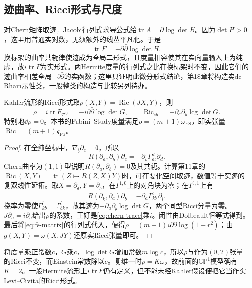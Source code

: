 \subsection{迹曲率、Ricci形式与尺度}
对Chern矩阵取迹，Jacobi行列式求导公式给$\operatorname{tr}A=\partial\log\det H$。因为$\det H>0$，这里用普通实对数，无须额外的线丛平凡化。于是
\begin{equation}\label{eq:chern-trace}
 \operatorname{tr}F=-\partial\bar\partial\log\det H.
\end{equation}
换标架的曲率共轭律使迹成为全局二形式，且度量相容使其在实向量输入上为纯虚，故$i\operatorname{tr}F$为实形式。两Hermite度量的行列式之比在换标架时不变，因此它们的迹曲率相差全局$-\partial\bar\partial$的实函数；这里只证明此微分形式结论，第18章将构造实de Rham示性类，一般整类的构造与比较另列待办。

\begin{theorem}\label{thm:kahler-ricci}
Kahler流形的Ricci形式取$\rho(X,Y)=\operatorname{Ric}(JX,Y)$，则
\begin{equation}\label{eq:kahler-ricci}
 \rho=i\operatorname{tr}F_{T^{1,0}}
 =-i\partial\bar\partial\log\det G,
 \qquad \operatorname{Ric}_{a\bar b}=-\partial_a\partial_{\bar b}\log\det G.
\end{equation}
特别地$\dd\rho=0$。本书的Fubini--Study度量满足$\rho=(m+1)\omega_{\mathrm{FS}}$，即实张量$\operatorname{Ric}=(m+1)g_{\mathrm{FS}}$。
\end{theorem}
\begin{proof}
在全纯坐标中，$\nabla_{\bar b}\partial_c=0$，所以
\[
 R(\partial_a,\partial_{\bar b})\partial_c
 =-\partial_{\bar b}\Gamma^d_{ac}\partial_d.
\]
Chern曲率为$(1,1)$型说明$R(\partial_a,\partial_b)=0$及其共轭。计算第11章的$\operatorname{Ric}(X,Y)=\operatorname{tr}(Z\mapsto R(Z,X)Y)$时，可在复化空间取迹，数值等于实迹的复双线性延拓。取$X=\partial_a,Y=\partial_{\bar b}$，在$T^{1,0}$上的对角块为零；在$T^{0,1}$上有
\[
 R(\partial_{\bar k},\partial_a)\partial_{\bar b}
 =-\partial_a\overline{\Gamma^l_{kb}}\,\partial_{\bar l}.
\]
挠率为零使$\Gamma^l_{kb}=\Gamma^l_{bk}$，故其迹为$-\partial_a\partial_{\bar b}\log\det G$，两个同型Ricci分量为零。$J\partial_a=i\partial_a$给出$\rho$的系数，正好是\eqref{eq:chern-trace}乘$i$。闭性由Dolbeault恒等式得到。最后将\eqref{eq:fs-matrix}的行列式代入，便得$\rho=(m+1)i\partial\bar\partial\log(1+r^2)$；由$g(X,Y)=\omega(X,JY)$还原实Ricci张量即可。
\end{proof}
将度量乘正常数$c$，$G$乘$c$，$\log\det G$增加常数$m\log c$，所以$\rho$与作为$(0,2)$张量的Ricci不变，而Einstein常数除以$c$。复维一时$\rho=K\omega$，故前面的$\mathbb{CP}^1$模型确有$K=2$。一般Hermite流形上$i\operatorname{tr}F$仍有定义，但不能未经Kahler假设便把它当作实Levi--Civita的Ricci形式。


